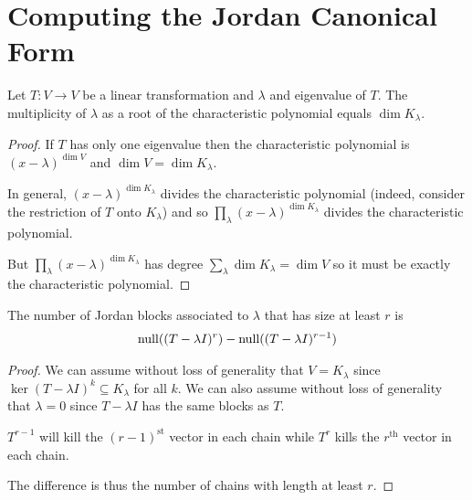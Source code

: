 \section{Computing the Jordan Canonical Form}
\begin{theorem}
  Let $T : V \to V$ be a linear transformation and $\lambda$ and eigenvalue of $T$.
  The multiplicity of $\lambda$ as a root of the characteristic polynomial equals $\dim K_\lambda$.
\end{theorem}
\begin{proof}
  If $T$ has only one eigenvalue then the characteristic polynomial is $(x-\lambda)^{\dim V}$ and $\dim V = \dim K_\lambda$.

  In general, $(x-\lambda)^{\dim K_\lambda}$ divides the characteristic polynomial (indeed, consider the restriction of $T$ onto $K_\lambda$)
  and so $\prod_{\lambda}(x-\lambda)^{\dim K_{\lambda}}$ divides the characteristic polynomial.

  But $\prod_{\lambda}(x-\lambda)^{\dim K_{\lambda}}$ has degree $\sum_\lambda \dim K_\lambda = \dim V$ so it must be exactly the characteristic polynomial.
\end{proof}

\begin{theorem}
  The number of Jordan blocks associated to $\lambda$ that has size at least $r$ is
  \begin{align}
    \operatorname{null} ((T-\lambda I)^r) - \operatorname{null} ((T-\lambda I)^{r-1})
  \end{align}
\end{theorem}
\begin{proof}
  We can assume without loss of generality that $V = K_\lambda$ since $\ker(T-\lambda I)^k \subseteq K_\lambda$ for all $k$.
  We can also assume without loss of generality that $\lambda = 0$ since $T - \lambda I$ has the same blocks as $T$.

  $T^{r-1}$ will kill the $(r-1)^{\text{st}}$ vector in each chain while $T^r$ kills the $r^{\text{th}}$ vector in each chain.

  The difference is thus the number of chains with length at least $r$.
\end{proof}
